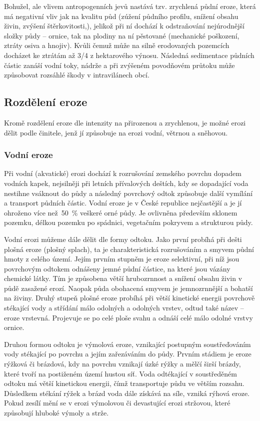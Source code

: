 Bohužel, ale vlivem antropogenních jevů nastává tzv. zrychlená půdní eroze, která má negativní vliv jak na kvalitu půd (zúžení půdního profilu, snížení obsahu živin, zvýšení štěrkovitosti,), jelikož při ní dochází k odstraňování nejúrodnější složky půdy – ornice, tak na plodiny na ní pěstované (mechanické poškození, ztráty osiva a hnojiv). Kvůli čemuž může na silně erodovaných pozemcích docházet ke ztrátám až 3/4 z hektarového výnosu. Následná sedimentace půdních částic zanáší vodní toky, nádrže a při zvýšeném povodňovém průtoku může způsobovat rozsáhlé škody v intravilánech obcí.\cite{Novotny2014}
\subsection{Rozdělení eroze}
Kromě rozdělení eroze dle intenzity na přirozenou a zrychlenou, je možné erozi dělit podle činitele, jenž jí způsobuje na erozi vodní, větrnou a sněhovou.\cite{Holy1994}
\subsubsection{Vodní eroze}
Při vodní (akvatické) erozi dochází k rozrušování zemského povrchu dopadem vodních kapek, nejsilněji při letních přívalových deštích, kdy se dopadající voda nestihne vsáknout do půdy a následný povrchový odtok způsobuje další vymílání a transport půdních částic. Vodní eroze je v České republice nejčastější a je jí ohroženo více než~50~\% veškeré orné půdy. Je ovlivněna především sklonem pozemku, délkou pozemku po spádnici, vegetačním pokryvem a strukturou půdy.

Vodní erozi můžeme dále dělit dle formy odtoku. Jako první probíhá při dešti plošná eroze (plošný splach), ta je charakteristická rozrušováním a smyvem půdní hmoty z celého území. Jejím prvním stupněm je eroze selektivní, při níž jsou povrchovým odtokem odnášeny jemné půdní částice, na které jsou vázány chemické látky. Tím je způsobena větší hrubozrnnost a snížení obsahu živin v půdě zasažené erozí. Naopak půda obohacená smyvem je jemnozrnnější a bohatší na živiny. Druhý stupeň plošné eroze probíhá při větší kinetické energii povrchově stékající vody a střídání málo odolných a odolných vrstev, odtud také název – eroze vrstevná. Projevuje se po celé ploše svahu a odnáší celé málo odolné vrstvy ornice.

Druhou formou odtoku je výmolová eroze, vznikající postupným soustřeďováním vody stékající po povrchu a jejím zařezáváním do půdy. Prvním stádiem je eroze rýžková či brázdová, kdy na povrchu vznikají úzké rýžky a mělčí širší brázdy, které tvoří na postiženém území hustou síť. Voda odtékající v soustředěném odtoku má větší kinetickou energii, čímž transportuje půdu ve větším rozsahu. Důsledkem stékání rýžek a brázd voda dále získává na síle, vzniká rýhová eroze. Pokud zesílí mění se v erozi výmolovou či devastující erozi stržovou, které způsobují hluboké výmoly a strže.\cite{Novotny2014}
